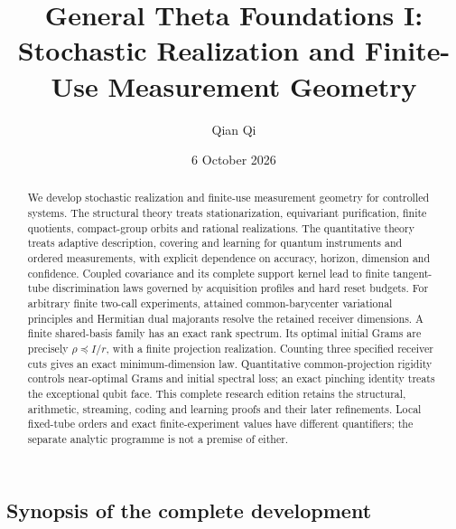 \documentclass[11pt]{amsart}
\title[General Theta Foundations I]{General Theta Foundations I:\\Stochastic Realization and Finite-Use Measurement Geometry}
\author{Qian Qi}
\date{6 October 2026}
\numberwithin{equation}{section}
\theoremstyle{definition}\newtheorem{definition}[theorem]{Definition}
\theoremstyle{remark}\newtheorem{remark}[theorem]{Remark}
\begin{document}
\raggedbottom
\begin{abstract}
We develop stochastic realization and finite-use measurement geometry
for controlled systems.  The structural theory treats stationarization,
equivariant purification, finite quotients, compact-group orbits and
rational realizations.  The quantitative theory treats adaptive
description, covering and learning for quantum instruments and ordered
measurements, with explicit dependence on accuracy, horizon, dimension
and confidence.  Coupled covariance and its complete support kernel
lead to finite tangent-tube discrimination laws governed by acquisition
profiles and hard reset budgets.  For arbitrary finite two-call
experiments, attained common-barycenter variational principles and
Hermitian dual majorants resolve the retained receiver dimensions.
A finite shared-basis family has an exact rank spectrum.  Its optimal
initial Grams are precisely $\rho\preceq I/r$, with a finite projection
realization.  Counting three specified receiver cuts gives an exact
minimum-dimension law.  Quantitative common-projection rigidity controls
near-optimal Grams and initial spectral loss; an exact pinching identity
treats the exceptional qubit face.  This complete research edition
retains the structural, arithmetic, streaming, coding and learning
proofs and their later refinements.  Local fixed-tube orders and exact
finite-experiment values have different quantifiers; the separate
analytic programme is not a premise of either.
\end{abstract}
\maketitle
\subsection*{Synopsis of the complete development}
\end{document}
